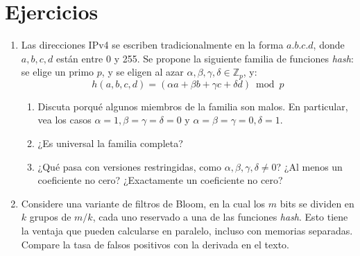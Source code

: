 \section*{Ejercicios}
\label{sec:exercises-27-previa}

  \begin{enumerate}
  \item
    Las direcciones IPv4 se escriben tradicionalmente
    en la forma \(a.b.c.d\),
    donde \(a, b, c, d\) están entre \num{0} y \num{255}.
    Se propone
    la siguiente familia de funciones \emph{\foreignlanguage{english}{hash}}:
    se elige un primo \(p\),
    y se eligen al azar \(\alpha, \beta, \gamma, \delta \in \mathbb{Z}_p\),
    y:
    \begin{equation*}
      h(a, b, c, d)
        = (\alpha a + \beta b + \gamma c + \delta d) \bmod p
    \end{equation*}
    \begin{enumerate}
    \item
      Discuta porqué algunos miembros de la familia son malos.
      En particular,
      vea los casos \(\alpha = 1, \beta = \gamma = \delta = 0\)
      y	 \(\alpha = \beta = \gamma = 0, \delta = 1\).
    \item
      ¿Es universal la familia completa?
    \item
      ¿Qué pasa con versiones restringidas,
      como \(\alpha, \beta, \gamma, \delta \ne 0\)?
      ¿Al menos un coeficiente no cero?
      ¿Exactamente un coeficiente no cero?
    \end{enumerate}
  \item
    Considere una variante de filtros de Bloom,
    en la cual los \(m\) bits se dividen en \(k\) grupos de \(m / k\),
    cada uno reservado
    a una de las funciones \emph{\foreignlanguage{english}{hash}}.
    Esto tiene la ventaja que pueden calcularse en paralelo,
    incluso con memorias separadas.
    Compare la tasa de falsos positivos con la derivada en el texto.
  \end{enumerate}



